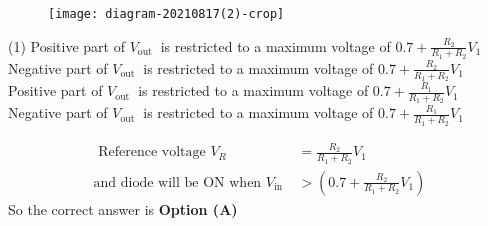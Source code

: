\begin{enumerate}
\begin{figure}[H]
\centering
\texttt{[image: diagram-20210817(2)-crop]}
\end{figure}
\begin{tasks}(1)
\task[\textbf{A.}] Positive part of $V_{\text {out }}$ is restricted to a maximum voltage of $0.7+\frac{R_{2}}{R_{1}+R_{2}} V_{1}$
\task[\textbf{B.}] Negative part of $V_{\text {out }}$ is restricted to a maximum voltage of $0.7+\frac{R_{2}}{R_{1}+R_{2}} V_{1}$
\task[\textbf{C.}] Positive part of $V_{\text {out }}$ is restricted to a maximum voltage of $0.7+\frac{R_{1}}{R_{1}+R_{2}} V_{1}$
\task[\textbf{D.}] Negative part of $V_{\text {out }}$ is restricted to a maximum voltage of $0.7+\frac{R_{1}}{R_{1}+R_{2}} V_{1}$
\end{tasks}
\begin{answer}
\begin{align*}
\text{	Reference voltage }V_{R}&=\frac{R_{2}}{R_{1}+R_{2}} V_{1}\\ \text{and diode will be ON when }V_{\text {in }}&>\left(0.7+\frac{R_{2}}{R_{1}+R_{2}} V_{1}\right)
\end{align*}
So the correct answer is \textbf{Option (A)}
\end{answer}
\end{enumerate}